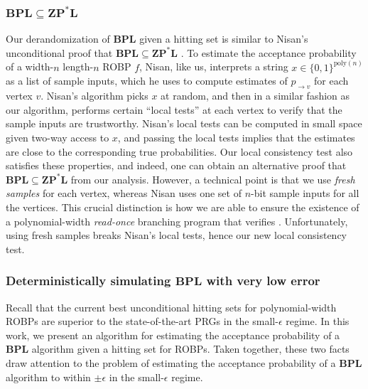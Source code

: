 \subsubsection{$\mathbf{BPL}\subseteq \mathbf{ZP}^*\mathbf{L}$}
Our derandomization of $\mathbf{BPL}$ given a hitting set is similar to Nisan's unconditional proof that $\mathbf{BPL} \subseteq \mathbf{ZP}^* \mathbf{L}$ \cite{Nis93}. To estimate the acceptance probability of a width-$n$ length-$n$ ROBP $f$, Nisan, like us, interprets a string $x \in \{0, 1\}^{\text{poly}(n)}$ as a list of sample inputs, which he uses to compute estimates of $p_{\to v}$ for each vertex $v$. Nisan's algorithm picks $x$ at random, and then in a similar fashion as our algorithm, performs certain ``local tests'' at each vertex to verify that the sample inputs are trustworthy. Nisan's local tests can be computed in small space given two-way access to $x$, and passing the local tests implies that the estimates are close to the corresponding true probabilities. Our local consistency test also satisfies these properties, and indeed, one can obtain an alternative proof that $\mathbf{BPL} \subseteq \mathbf{ZP}^* \mathbf{L}$ from our analysis. However, a technical point is that we use \emph{fresh samples} for each vertex, whereas Nisan uses one set of $n$-bit sample inputs for all the vertices. This crucial distinction is how we are able to ensure the existence of a polynomial-width \emph{read-once} branching program that verifies . Unfortunately, using fresh samples breaks Nisan's local tests, hence our new local consistency test.

\subsubsection{Deterministically simulating $\mathbf{BPL}$ with very low error}

Recall that the current best unconditional hitting sets for polynomial-width ROBPs \cite{BCG20, HZ20, CL20, CDRSTS21, PV21, Hoz21} are superior to the state-of-the-art PRGs \cite{Nis92} in the small-$\epsilon$ regime. In this work, we present an algorithm for estimating the acceptance probability of a $\mathbf{BPL}$ algorithm given a hitting set for ROBPs. Taken together, these two facts draw attention to the problem of estimating the acceptance probability of a $\mathbf{BPL}$ algorithm to within $\pm \epsilon$ in the small-$\epsilon$ regime.

